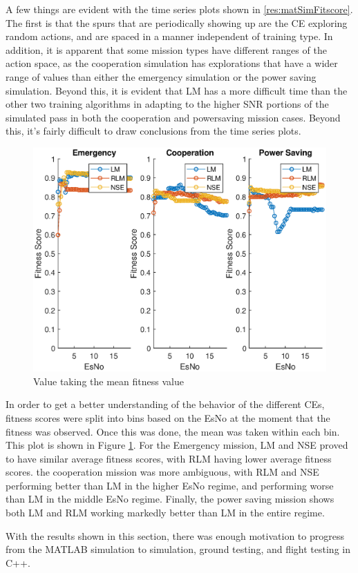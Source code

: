 \par A few things are evident with the time series plots shown in \ref{res:matSimFitscore}. The first is that the spurs that are periodically showing up are the CE exploring random actions, and are spaced in a manner independent of training type. In addition, it is apparent that some mission types have different ranges of the action space, as the cooperation simulation has explorations that have a wider range of values than either the emergency simulation or the power saving simulation. Beyond this, it is evident that LM has a more difficult time than the other two training algorithms in adapting to the higher SNR portions of the simulated pass in both the cooperation and powersaving mission cases. Beyond this, it's fairly difficult to draw conclusions from the time series plots.
\begin{figure}
\centering
\includegraphics[width=\textwidth]{figures/matlab_sim_results/binnedMeans_sim.eps}
\caption{Value taking the mean fitness value}
\label{res:matSimBinMean}
\end{figure}
\par In order to get a better understanding of the behavior of the different CEs, fitness scores were split into bins based on the EsNo at the moment that the fitness was observed. Once this was done, the mean was taken within each bin. This plot is shown in Figure \ref{res:matSimBinMean}. For the Emergency mission, LM and NSE proved to have similar average fitness scores, with RLM having lower average fitness scores. the cooperation mission was more ambiguous, with RLM and NSE performing better than LM in the higher EsNo regime, and performing worse than LM in the middle EsNo regime. Finally, the power saving mission shows both LM and RLM working markedly better than LM in the entire regime.
\par With the results shown in this section, there was enough motivation to progress from the MATLAB simulation to simulation, ground testing, and flight testing in C++. 
\clearpage
